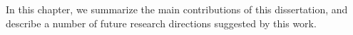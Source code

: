 In this chapter, we summarize the main contributions of this dissertation,
    and describe a number of future research directions suggested by this work.

